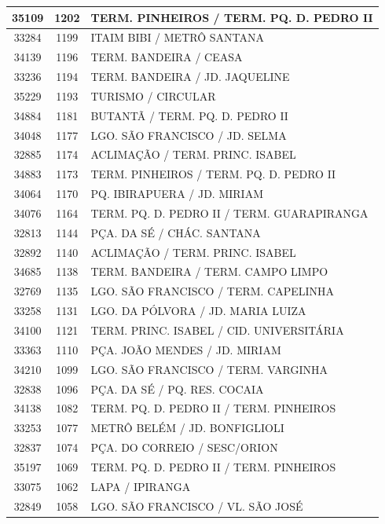\documentclass[
	12pt,				%
	oneside,			%
	a4paper,			%
	english,			%
	brazil				%
	]{abntex2ppgsi}
\begin{document}
{{{\begin{apendicesenv}
\begin{longtable}{c|c|p{7cm}}
 \hline 
35109 &	1202 &	TERM. PINHEIROS / TERM. PQ. D. PEDRO II \\ 
 \hline 
33284 &	1199 &	ITAIM BIBI / METRÔ SANTANA \\ 
 \hline 
34139 &	1196 &	TERM. BANDEIRA / CEASA \\ 
 \hline 
33236 &	1194 &	TERM. BANDEIRA / JD. JAQUELINE \\ 
 \hline 
35229 &	1193 &	TURISMO / CIRCULAR \\ 
 \hline 
34884 &	1181 &	BUTANTÃ / TERM. PQ. D. PEDRO II \\ 
 \hline 
34048 &	1177 &	LGO. SÃO FRANCISCO / JD. SELMA \\ 
 \hline 
32885 &	1174 &	ACLIMAÇÃO / TERM. PRINC. ISABEL \\ 
 \hline 
34883 &	1173 &	TERM. PINHEIROS / TERM. PQ. D. PEDRO II \\ 
 \hline 
34064 &	1170 &	PQ. IBIRAPUERA / JD. MIRIAM \\ 
 \hline 
34076 &	1164 &	TERM. PQ. D. PEDRO II / TERM. GUARAPIRANGA \\ 
 \hline 
32813 &	1144 &	PÇA. DA SÉ / CHÁC. SANTANA \\ 
 \hline 
32892 &	1140 &	ACLIMAÇÃO / TERM. PRINC. ISABEL \\ 
 \hline 
34685 &	1138 &	TERM. BANDEIRA / TERM. CAMPO LIMPO \\ 
 \hline 
32769 &	1135 &	LGO. SÃO FRANCISCO / TERM. CAPELINHA \\ 
 \hline 
33258 &	1131 &	LGO. DA PÓLVORA / JD. MARIA LUIZA \\ 
 \hline 
34100 &	1121 &	TERM. PRINC. ISABEL / CID. UNIVERSITÁRIA \\ 
 \hline 
33363 &	1110 &	PÇA. JOÃO MENDES / JD. MIRIAM \\ 
 \hline 
34210 &	1099 &	LGO. SÃO FRANCISCO / TERM. VARGINHA \\ 
 \hline 
32838 &	1096 &	PÇA. DA SÉ / PQ. RES. COCAIA \\ 
 \hline 
34138 &	1082 &	TERM. PQ. D. PEDRO II / TERM. PINHEIROS \\ 
 \hline 
33253 &	1077 &	METRÔ BELÉM / JD. BONFIGLIOLI \\ 
 \hline 
32837 &	1074 &	PÇA. DO CORREIO / SESC/ORION \\ 
 \hline 
35197 &	1069 &	TERM. PQ. D. PEDRO II / TERM. PINHEIROS \\ 
 \hline 
33075 &	1062 &	LAPA / IPIRANGA \\ 
 \hline 
32849 &	1058 &	LGO. SÃO FRANCISCO / VL. SÃO JOSÉ \\ 

\end{longtable}
\end{apendicesenv}}}}
\end{document}
